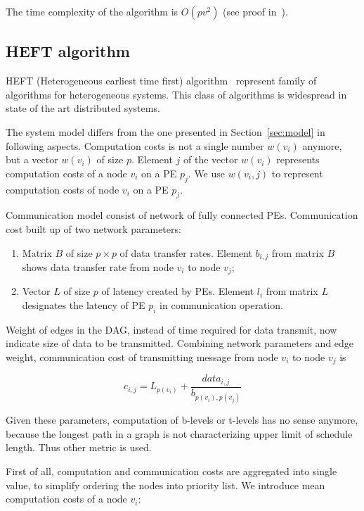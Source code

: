 The time complexity of the algorithm is $O(p v^2)$ (see proof
in~\cite{hwang1989scheduling}).


\subsection{HEFT algorithm}
\label{sec:heft}

HEFT (Heterogeneous earliest time first)
algorithm~\cite{Topcuoglu2002} represent family of algorithms for
heterogeneous systems. This class of algorithms is widespread in state
of the art distributed systems.

The system model differs from the one presented in
Section~\ref{sec:model} in following aspects. Computation costs is not
a single number $w(v_i)$ anymore, but a vector $w(v_i)$ of size
$p$. Element $j$ of the vector $w(v_i)$ represents computation costs
of a node $v_i$ on a PE $p_j$. We use $w(v_i, j)$ to represent
computation costs of node $v_i$ on a PE $p_j$.

Communication model consist of network of fully connected
PEs. Communication cost built up of two network parameters:

\begin{enumerate}
\item Matrix $B$ of size $p \times p$ of data transfer rates. Element
  $b_{i,j}$ from matrix $B$ shows data transfer rate from node $v_i$
  to node $v_j$;
\item Vector $L$ of size $p$ of latency created by PEs. Element $l_i$
  from matrix $L$ designates the latency of PE $p_i$ in communication
  operation.
\end{enumerate}

Weight of edges in the DAG, instead of time required for data
transmit, now indicate size of data to be transmitted. Combining
network parameters and edge weight, communication cost of transmitting
message from node $v_i$ to node $v_j$ is

\[
c_{i,j} = L_{p(v_i)} + \frac{data_{i, j}}{b_{p(v_i),p(v_j)}}
\]

Given these parameters, computation of b-levels or t-levels has no
sense anymore, because the longest path in a graph is not
characterizing upper limit of schedule length. Thus other metric is
used.

First of all, computation and communication costs are aggregated into
single value, to simplify ordering the nodes into priority list. We
introduce mean computation costs of a node $v_i$:

